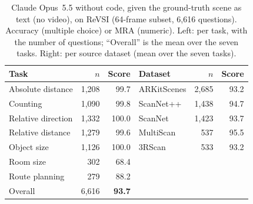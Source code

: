 \begin{table}[t]
\centering
\caption{Claude Opus~5.5 without code, given the ground-truth scene as text (no video), on ReVSI (64-frame subset,
6,616 questions). Accuracy (multiple choice) or MRA (numeric). Left: per task, with the number of questions;
``Overall'' is the mean over the seven tasks. Right: per source dataset (mean over the seven tasks).}
\label{tab:claude-revsi}
\begin{tabular}{lrr@{\hspace{2.5em}}lrr}
\toprule
Task & $n$ & Score & Dataset & $n$ & Score \\
\midrule
Absolute distance  & 1,208 & 99.7  & ARKitScenes & 2,685 & 93.2 \\
Counting           & 1,090 & 99.8  & ScanNet++   & 1,438 & 94.7 \\
Relative direction & 1,332 & 100.0 & ScanNet     & 1,423 & 93.7 \\
Relative distance  & 1,279 & 99.6  & MultiScan   &   537 & 95.5 \\
Object size        & 1,126 & 100.0 & 3RScan      &   533 & 93.2 \\
Room size          &   302 & 68.4  &             &       &      \\
Route planning     &   279 & 88.2  &             &       &      \\
\midrule
Overall            & 6,616 & \textbf{93.7} & & & \\
\bottomrule
\end{tabular}
\end{table}
